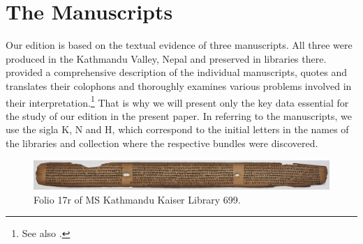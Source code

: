 \chapter{The Manuscripts}

Our edition is based on the textual evidence of three manuscripts.  All three were
produced in the Kathmandu Valley, Nepal and preserved in libraries there.
\textcites[\S 2.1]{kleb-2021b} provided a comprehensive description of the
individual manuscripts, quotes and translates their colophons and thoroughly
examines various problems involved in their interpretation.\footnote{See also 
\cite{hari-2010,hari-2011,hari-2014}.} That is why we will
present only the key data essential for the study of our edition in the present
paper. In referring to the manuscripts, we use the sigla K, N and H, which
correspond to the initial letters in the names of the libraries and collection
where the respective bundles were discovered.

\begin{figure}[t]
    \centering
    \includegraphics[draft=false,width=1\linewidth]{"media/017r IMG_0065"}
    \caption{Folio 17r of MS Kathmandu Kaiser Library 699.}
    \label{fig:017r-img0065}
\end{figure}


